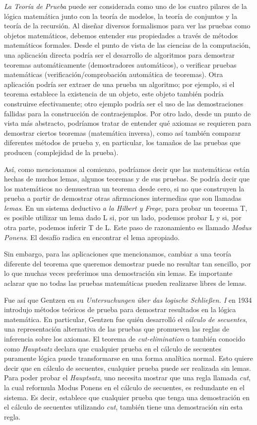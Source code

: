 \textit{La Teoría de Prueba} puede ser considerada como uno de los cuatro pilares de la lógica matemática junto con la teoría de modelos, la teoría de conjuntos y la teoría de la recursión. Al diseñar diversos formalismos para ver las pruebas como objetos matemáticos, debemos entender sus propiedades a través de métodos matemáticos formales. Desde el punto de vista de las ciencias de la computación, una aplicación directa podría ser el desarrollo de algoritmos para demostrar teoremas automáticamente (demostradores automáticos), o verificar pruebas matemáticas (verificación/comprobación automática de teoremas). Otra aplicación podría ser extraer de una prueba un algoritmo; por ejemplo, si el teorema establece la existencia de un objeto, este objeto también podría construirse efectivamente; otro ejemplo podría ser el uso de las demostraciones fallidas para la construcción de contraejemplos. Por otro lado, desde un punto de vista más abstracto, podríamos tratar de entender qué axiomas se requieren para demostrar ciertos teoremas (matemática inversa), como así también comparar diferentes métodos de prueba y, en particular, los tamaños de las pruebas que producen (complejidad de la prueba).

Así, como mencionamos al comienzo, podríamos decir que las matemáticas están hechas de muchos lemas, algunos teoremas y de sus pruebas. Se podría decir que los matemáticos no demuestran un teorema desde cero, si no que construyen la prueba a partir de demostrar otras afirmaciones intermedias que son llamadas \emph{lemas}.
En un sistema deductivo \emph{a la Hilbert y Frege}, para probar un teorema T, es posible utilizar un lema dado L si, por un lado, podemos probar L y si, por otra parte, podemos inferir T de L. Este paso de razonamiento es llamado \emph{Modus Ponens}. El desafío radica en encontrar el lema apropiado.

Sin embargo, para las aplicaciones que mencionamos, cambiar a una teoría diferente del teorema que queremos demostrar puede no resultar tan sencillo, por lo que muchas veces preferimos una demostración sin lemas. Es importante aclarar que no todas las pruebas matemáticas pueden realizarse libres de lemas.

Fue así que Gentzen en su \emph{Untersuchungen {\"u}ber das logische Schlie{\ss}en. I} en 1934 \cite{gentzen1934} introdujo métodos teóricos de prueba para demostrar resultados en la lógica matemática. En particular, Gentzen fue quién desarrolló el \emph{cálculo de secuentes}, una representación alternativa de las pruebas que promueven las reglas de inferencia sobre los axiomas. El teorema de \emph{cut-elimination} o también conocido como \emph{Hauptsatz} declara que cualquier prueba en el cálculo de secuentes puramente lógica puede transformarse en una forma analítica normal. Esto quiere decir que en cálculo de secuentes, cualquier prueba puede ser realizada sin lemas. Para poder probar el \emph{Hauptsatz}, uno necesita mostrar que una regla llamada \emph{cut}, la cual reformula Modus Ponens en el cálculo de secuentes, es redundante en el sistema. Es decir, establece que cualquier prueba que tenga una demostración en el cálculo de secuentes utilizando \emph{cut}, también tiene una demostración sin esta regla.

